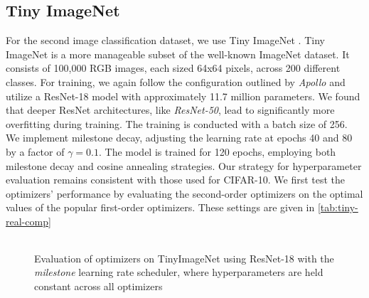 \subsection{Tiny ImageNet}
For the second image classification dataset, we use Tiny ImageNet \cite{tiny_imagenet}.
Tiny ImageNet is a more manageable subset of the well-known ImageNet dataset.
It consists of 100,000 RGB images, each sized 64x64 pixels, across 200 different classes.
For training, we again follow the configuration outlined by \emph{Apollo} \cite{apollo} and utilize a ResNet-18 model with approximately 11.7 million parameters. 
We found that deeper ResNet architectures, like \emph{ResNet-50}, lead to significantly more overfitting during training.
The training is conducted with a batch size of 256. We implement milestone decay, adjusting the 
learning rate at epochs 40 and 80 by a factor of $\gamma=0.1$.
The model is trained for 120 epochs, employing both milestone decay and cosine annealing strategies. Our strategy for hyperparameter evaluation remains consistent with those used for CIFAR-10. We first 
test the optimizers' performance by evaluating the second-order optimizers on the optimal values of 
the popular first-order optimizers. These settings are given in \ref{tab:tiny-real-comp}

\begin{figure}[h!]
    \centering
    \begin{tabular}{cc}
         \\ 
    \end{tabular}
    \caption{Evaluation of optimizers on TinyImageNet using ResNet-18 with the \emph{milestone} learning rate scheduler, where hyperparameters
    are held constant across all optimizers}
    \label{fig:tinyimagenet-perf-milestone}
\end{figure}

